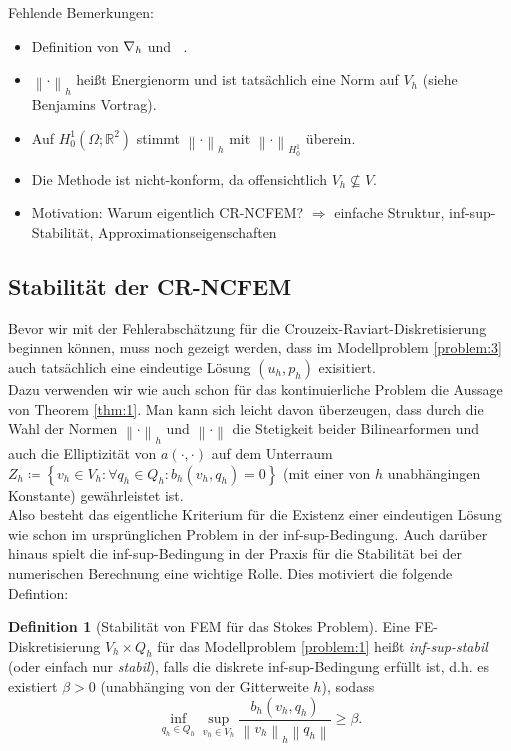 \documentclass[a4paper]{scrartcl}
\newcommand{\real}{\mathbb{R}}
\newcommand{\Hzero}{H_0^1}
\newcommand{\norm}[1]{\left\lVert#1\right\rVert}
\newcommand{\hnorm}[1]{\left\lVert#1\right\rVert_h}
\newcommand{\set}[1]{\left\{#1\right\}}
\DeclareMathOperator{\divh}{div_h}
\DeclareMathOperator{\nablah}{\nabla_{\emph{h}}}
\theoremstyle{plain}
\theoremstyle{definition}
\newtheorem{definition}{Definition}
\theoremstyle{remark}
\begin{document}
{\color{red}
\noindent Fehlende Bemerkungen: 
\begin{itemize}
\item Definition von \(\nablah\) und \(\divh\).
\item \(\hnorm{\cdot}\) heißt Energienorm und ist tatsächlich eine
  Norm auf \(V_h\) (siehe Benjamins Vortrag).
\item Auf \(\Hzero(\Omega; \real^2)\) stimmt \(\hnorm{\cdot}\) mit
  \(\norm{\cdot}_{\Hzero}\) überein.
\item Die Methode ist nicht-konform, da offensichtlich \(V_h
  \not\subseteq V\).
\item Motivation: Warum eigentlich CR-NCFEM? \(\Rightarrow\) einfache Struktur,
  inf-sup-Stabilität, Approximationseigenschaften
\end{itemize}
}

\subsection{Stabilität der CR-NCFEM}
\label{sec:stabilitat-der-cr}

Bevor wir mit der Fehlerabschätzung für die
Crouzeix-Raviart-Diskretisierung beginnen können, muss noch gezeigt
werden, dass im Modellproblem \ref{problem:3} auch tatsächlich eine
eindeutige Lösung \((u_h,p_h)\) exisitiert. \\

\noindent Dazu verwenden wir wie auch schon für das kontinuierliche Problem die
Aussage von Theorem \ref{thm:1}. Man kann sich leicht davon
überzeugen, dass durch die Wahl der Normen \(\hnorm{\cdot}\) und
\(\norm{\cdot}\) die Stetigkeit beider Bilinearformen und auch die
Elliptizität von \(a(\cdot, \cdot)\) auf dem Unterraum \(Z_h \coloneqq
\set{v_h \in V_h\colon \forall q_h \in Q_h\colon b_h(v_h, q_h) = 0}\)
(mit einer von \(h\) unabhängingen Konstante) gewährleistet ist. \\

\noindent Also besteht das eigentliche Kriterium für die Existenz
einer eindeutigen Lösung wie schon im ursprünglichen Problem in der
inf-sup-Bedingung. Auch darüber hinaus spielt die inf-sup-Bedingung
in der Praxis für die Stabilität bei der numerischen Berechnung eine
wichtige Rolle. Dies motiviert die folgende Defintion: 

\begin{definition}[Stabilität von FEM für das Stokes Problem] \label{def:1}
  Eine FE-Diskretisierung \(V_h\times Q_h\) für das Modellproblem
  \ref{problem:1} heißt \emph{inf-sup-stabil} (oder einfach nur
  \emph{stabil}), falls die diskrete inf-sup-Bedingung erfüllt ist,
  d.h. es existiert \(\beta > 0\) (unabhänging von der Gitterweite
  \(h\)), sodass 
  \begin{equation}
    \label{eq:14}
    \inf_{q_h \in Q_h} \sup_{v_h \in V_h} \frac{b_h(v_h, q_h)}{\hnorm{v_h} \norm{q_h}} \geq \beta. 
  \end{equation}
  \end{definition}
\end{document}
